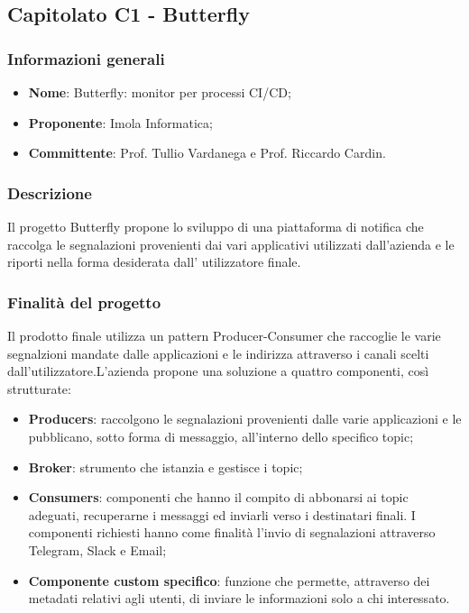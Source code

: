 \subsection{Capitolato C1 - Butterfly}
\subsubsection{Informazioni generali}
\begin{itemize}
	\item \textbf{Nome}: Butterfly: monitor per processi CI/CD;
	\item \textbf{Proponente}: Imola Informatica;
	\item \textbf{Committente}: Prof. Tullio Vardanega e Prof. Riccardo Cardin.
\end{itemize}
\subsubsection{Descrizione}
Il progetto Butterfly propone lo sviluppo di una piattaforma di notifica che raccolga le segnalazioni provenienti dai vari applicativi utilizzati dall’azienda e le riporti nella forma desiderata dall’ utilizzatore finale.

\subsubsection{Finalità del progetto}
Il prodotto finale utilizza un pattern Producer-Consumer che raccoglie le varie segnalzioni mandate dalle applicazioni e le indirizza attraverso i canali scelti dall’utilizzatore.L’azienda propone una soluzione a quattro componenti, così strutturate:
\begin{itemize}
	\item \textbf{Producers}: raccolgono le segnalazioni provenienti dalle varie applicazioni e le pubblicano, sotto forma di messaggio, all’interno dello specifico topic;
	\item \textbf{Broker}: strumento che istanzia e gestisce i topic;
	\item \textbf{Consumers}: componenti che hanno il compito di abbonarsi ai topic adeguati, recuperarne i messaggi ed inviarli verso i destinatari finali. I componenti richiesti hanno come finalità l’invio di segnalazioni attraverso Telegram, Slack e Email;
    \item \textbf{Componente custom specifico}: funzione che permette, attraverso dei metadati relativi agli utenti, di inviare le informazioni solo a chi interessato.
\end{itemize}

